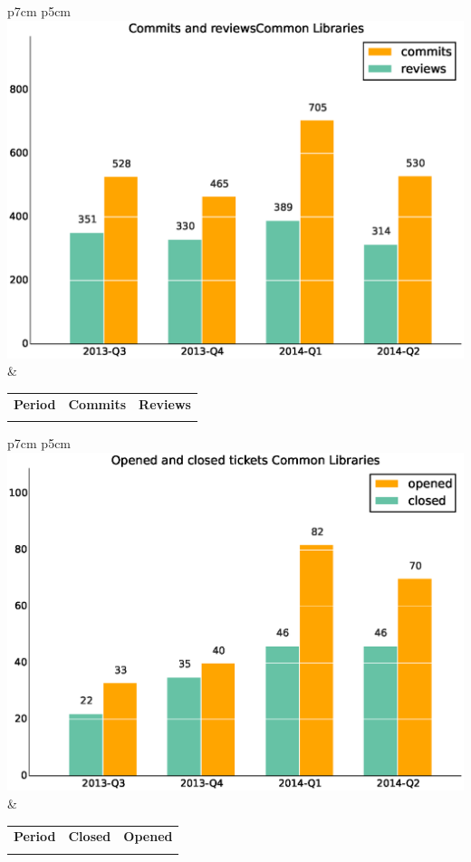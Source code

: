 \documentclass[a4wide,11pt]{report}
\begin{document}
\begin{tabular}{p{7cm} p{5cm}}
    \vspace{0pt} 
    \includegraphics[scale=.35]{figs/commitsCommonLibraries.eps}
    & 
    \vspace{0pt}
    \begin{tabular}{l|r|r|}%
    \bfseries Period & \bfseries Commits & \bfseries Reviews %
    \csvreader[head to column names]{data/commitsCommonLibraries.csv}{}%
    {\\ & \commits & \submitted}
    \end{tabular}
\end{tabular}

\begin{tabular}{p{7cm} p{5cm}}
    \vspace{0pt} 
    \includegraphics[scale=.35]{figs/closedCommonLibraries.eps}
    & 
    \vspace{0pt}
    \begin{tabular}{l|r|r|}%
\bfseries Period & \bfseries Closed & \bfseries Opened
    \csvreader[head to column names]{data/closedCommonLibraries.csv}{}%
    {\\ & \closed & \opened}
    \end{tabular}
\end{tabular}
\end{document}
